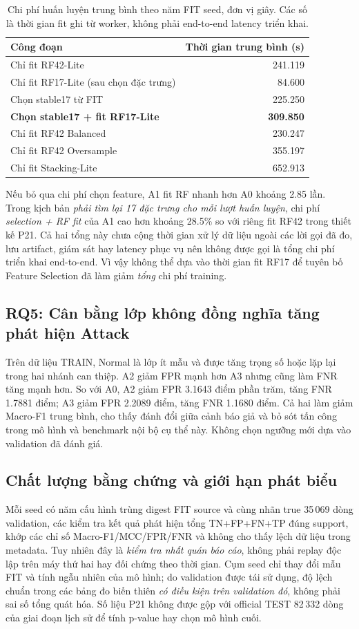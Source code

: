 \begin{table}[htbp]\centering\small
\renewcommand{\arraystretch}{1.22}
\caption{Chi phí huấn luyện trung bình theo năm FIT seed, đơn vị giây. Các số là thời gian fit ghi từ worker, không phải end-to-end latency triển khai.}
\label{tab:p21-cost}
\begin{tabular}{lr}\toprule
Công đoạn & Thời gian trung bình (s)\\\midrule
Chỉ fit RF42-Lite & 241.119\\
Chỉ fit RF17-Lite (sau chọn đặc trưng) & 84.600\\
Chọn stable17 từ FIT & 225.250\\
\textbf{Chọn stable17 + fit RF17-Lite} & \textbf{309.850}\\
Chỉ fit RF42 Balanced & 230.247\\
Chỉ fit RF42 Oversample & 355.197\\
Chỉ fit Stacking-Lite & 652.913\\\bottomrule
\end{tabular}
\end{table}
Nếu bỏ qua chi phí chọn feature, A1 fit RF nhanh hơn A0 khoảng 2.85 lần. Trong kịch bản \emph{phải tìm lại 17 đặc trưng cho mỗi lượt huấn luyện}, chi phí \emph{selection + RF fit} của A1 cao hơn khoảng 28.5\% so với riêng fit RF42 trong thiết kế P21. Cả hai tổng này chưa cộng thời gian xử lý dữ liệu ngoài các lời gọi đã đo, lưu artifact, giám sát hay latency phục vụ nên không được gọi là tổng chi phí triển khai end-to-end. Vì vậy không thể dựa vào thời gian fit RF17 để tuyên bố Feature Selection đã làm giảm \emph{tổng} chi phí training.

\subsection{RQ5: Cân bằng lớp không đồng nghĩa tăng phát hiện Attack}
Trên dữ liệu TRAIN, Normal là lớp ít mẫu và được tăng trọng số hoặc lặp lại trong hai nhánh can thiệp. A2 giảm FPR mạnh hơn A3 nhưng cũng làm FNR tăng mạnh hơn. So với A0, A2 giảm FPR 3.1643 điểm phần trăm, tăng FNR 1.7881 điểm; A3 giảm FPR 2.2089 điểm, tăng FNR 1.1680 điểm. Cả hai làm giảm Macro-F1 trung bình, cho thấy đánh đổi giữa cảnh báo giả và bỏ sót tấn công trong mô hình và benchmark nội bộ cụ thể này. Không chọn ngưỡng mới dựa vào validation đã đánh giá.

\subsection{Chất lượng bằng chứng và giới hạn phát biểu}
Mỗi seed có năm cấu hình trùng digest FIT source và cùng nhãn true 35\,069 dòng validation, các kiểm tra kết quả phát hiện tổng TN+FP+FN+TP đúng support, khớp các chỉ số Macro-F1/MCC/FPR/FNR và không cho thấy lệch dữ liệu trong metadata. Tuy nhiên đây là \emph{kiểm tra nhất quán báo cáo}, không phải replay độc lập trên máy thứ hai hay đối chứng theo thời gian. Cụm seed chỉ thay đổi mẫu FIT và tính ngẫu nhiên của mô hình; do validation được tái sử dụng, độ lệch chuẩn trong các bảng đo biến thiên \emph{có điều kiện trên validation đó}, không phải sai số tổng quát hóa. Số liệu P21 không được gộp với official TEST 82\,332 dòng của giai đoạn lịch sử để tính p-value hay chọn mô hình cuối.
